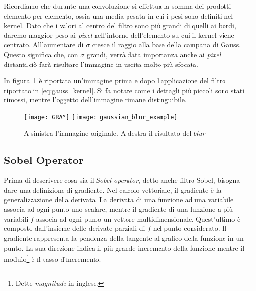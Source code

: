 Ricordiamo che durante una convoluzione si effettua la somma dei prodotti elemento per elemento, ossia una media pesata in cui i pesi sono definiti nel kernel.
Dato che i valori al centro del filtro sono più grandi di quelli ai bordi, daremo maggior peso ai \textit{pixel} nell'intorno dell'elemento su cui il kernel viene centrato.
All'aumentare di $\sigma$ cresce il raggio alla base della campana di Gauss.
Questo significa che, con $\sigma$ grandi, verrà data importanza anche ai \textit{pixel} distanti,ciò farà risultare l'immagine in uscita molto più sfocata.

In figura~\ref{fig:gaussian_blur_example} è riportata un'immagine prima e dopo l'applicazione del filtro riportato in \ref{eq:gauss_kernel}.
Si fa notare come i dettagli più piccoli sono stati rimossi, mentre l'oggetto dell'immagine rimane distinguibile.

\begin{figure}[ht] %
  \begin{center}
    \texttt{[image: GRAY]}
    \texttt{[image: gaussian\_blur\_example]}
    \caption{A sinistra l'immagine originale. A destra il risultato del \textit{blur}}
    \label{fig:gaussian_blur_example}
  \end{center}
\end{figure}





\subsection {Sobel Operator}
Prima di descrivere cosa sia il \textit{Sobel operator}, detto anche filtro Sobel, bisogna dare una definizione di gradiente.
Nel calcolo vettoriale, il gradiente è la generalizzazione della derivata.
La derivata di una funzione ad una variabile associa ad ogni punto uno scalare, mentre il gradiente di una funzione a più variabili $f$ associa ad ogni punto un vettore multidimensionale.
Quest'ultimo è composto dall'insieme delle derivate parziali di $f$ nel punto considerato.
Il gradiente rappresenta la pendenza della tangente al grafico della funzione in un punto.
La sua direzione indica il più grande incremento della funzione mentre il modulo\footnote{Detto \textit{magnitude} in inglese.} è il tasso d'incremento.

